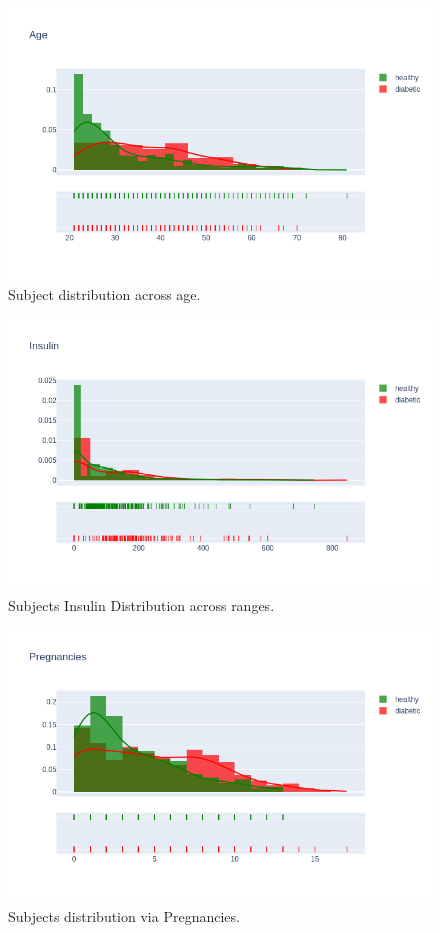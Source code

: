 \documentclass[12pt]{article}
\begin{document}
\begin{figure}[ht]
\centering
\includegraphics[width=1\textwidth]{11.png}
\caption{\label{fig:2} Subject distribution across age.}
\end{figure}

\begin{figure}[ht]
\centering
\includegraphics[width=1\textwidth]{14.png}
\caption{\label{fig:5} Subjects Insulin Distribution across ranges.}
\end{figure}

\begin{figure}[ht]
\centering
\includegraphics[width=1\textwidth]{12.png}
\caption{\label{fig:3} Subjects distribution via Pregnancies.}
\end{figure}
\end{document}
